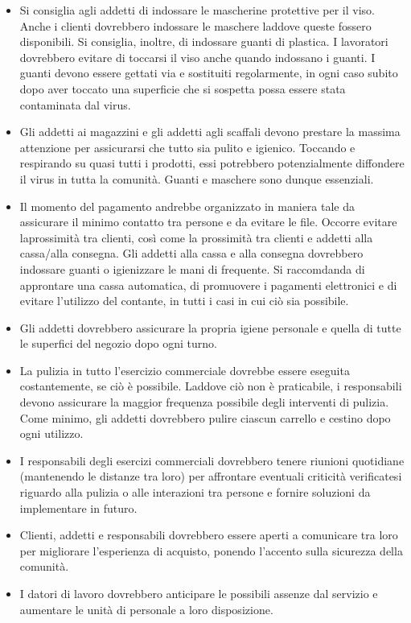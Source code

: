 \documentclass[onecolumn,journal]{IEEEtran}
\begin{document}
\begin{multicols}{2}
\begin{itemize}
  \item Si consiglia agli addetti di indossare le mascherine protettive per il viso. Anche i clienti dovrebbero indossare le maschere laddove queste fossero disponibili. Si consiglia, inoltre, di indossare guanti di plastica. I lavoratori dovrebbero evitare di toccarsi il viso anche quando indossano i guanti. I guanti devono essere gettati via e sostituiti regolarmente, in ogni caso subito dopo aver toccato una superficie che si sospetta possa essere stata contaminata dal virus.
  \item Gli addetti ai magazzini e gli addetti agli scaffali devono prestare la massima attenzione per assicurarsi che tutto sia pulito e igienico. Toccando e respirando su quasi tutti i prodotti, essi potrebbero potenzialmente diffondere il virus in tutta la comunità. Guanti e maschere sono dunque essenziali.
  \item Il momento del pagamento andrebbe organizzato in maniera tale da assicurare il minimo contatto tra persone e da evitare le file. Occorre evitare laprossimità tra clienti, così come la prossimità tra clienti e addetti alla cassa/alla consegna. Gli addetti alla cassa e alla consegna dovrebbero indossare guanti o igienizzare le mani di frequente. Si raccomdanda di approntare una cassa automatica, di promuovere i pagamenti elettronici e di evitare l'utilizzo del contante, in tutti i casi in cui ciò sia possibile.
  \item Gli addetti dovrebbero assicurare la propria igiene personale e quella di tutte le superfici del negozio dopo ogni turno.
  \item La pulizia in tutto l'esercizio commerciale dovrebbe essere eseguita costantemente, se ciò è possibile. Laddove ciò non è praticabile, i responsabili devono assicurare la maggior frequenza possibile degli interventi di pulizia. Come minimo, gli addetti  dovrebbero pulire ciascun carrello e cestino dopo ogni utilizzo.
  \item  I responsabili degli esercizi commerciali dovrebbero tenere riunioni quotidiane (mantenendo le distanze tra loro) per affrontare eventuali criticità verificatesi riguardo alla pulizia o alle interazioni tra persone e fornire soluzioni da implementare in futuro.
  \item Clienti, addetti e responsabili dovrebbero essere aperti a comunicare tra loro per migliorare l'esperienza di acquisto, ponendo l'accento sulla sicurezza della comunità.
  \item I datori di lavoro dovrebbero anticipare le possibili assenze dal servizio e aumentare le unità di personale a loro disposizione.
\end{itemize}



\end{multicols}
\end{document}
